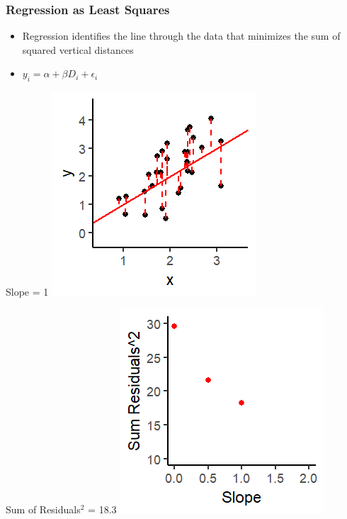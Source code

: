 \documentclass[xcolor=x11names,compress]{beamer}\usepackage[]{graphicx}\usepackage[]{color}
\makeatletter
\def\maxwidth{ %
  \ifdim\Gin@nat@width>\linewidth
    \linewidth
  \else
    \Gin@nat@width
  \fi
}
\newenvironment{knitrout}{}{} %
\renewcommand{\(}{\begin{columns}}
\renewcommand{\)}{\end{columns}}
\newcommand{\<}[1]{\begin{column}{#1}}
\renewcommand{\>}{\end{column}}
\makeatother
\begin{document}
\begin{frame}
\frametitle{Regression as Least Squares}
\begin{itemize}
\item Regression identifies the line through the data that minimizes the sum of squared vertical distances 
\item $y_i = \alpha + \beta D_i + \epsilon_i$
\end{itemize}
\begin{multicols}{2}
Slope = 1
\begin{knitrout}
\color{fgcolor}
\includegraphics[width=\maxwidth]{figure/graph_ols3-1} 

\end{knitrout}
\columnbreak
Sum of Residuals$^2$ = 18.3
\begin{knitrout}
\color{fgcolor}
\includegraphics[width=\maxwidth]{figure/graph_ssr3-1} 

\end{knitrout}
\end{multicols}
\end{frame}
\end{document}
